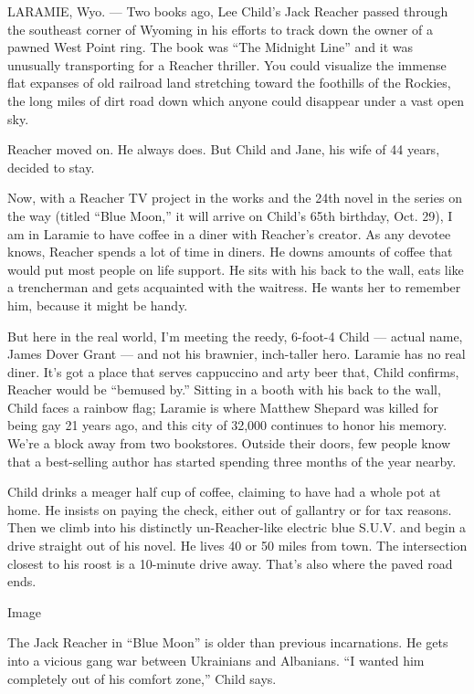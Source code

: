 LARAMIE, Wyo. --- Two books ago, Lee Child's Jack Reacher passed through
the southeast corner of Wyoming in his efforts to track down the owner
of a pawned West Point ring. The book was ``The Midnight Line'' and it
was unusually transporting for a Reacher thriller. You could visualize
the immense flat expanses of old railroad land stretching toward the
foothills of the Rockies, the long miles of dirt road down which anyone
could disappear under a vast open sky.

Reacher moved on. He always does. But Child and Jane, his wife of 44
years, decided to stay.

Now, with a Reacher TV project in the works and the 24th novel in the
series on the way (titled ``Blue Moon,'' it will arrive on Child's 65th
birthday, Oct. 29), I am in Laramie to have coffee in a diner with
Reacher's creator. As any devotee knows, Reacher spends a lot of time in
diners. He downs amounts of coffee that would put most people on life
support. He sits with his back to the wall, eats like a trencherman and
gets acquainted with the waitress. He wants her to remember him, because
it might be handy.

But here in the real world, I'm meeting the reedy, 6-foot-4 Child ---
actual name, James Dover Grant --- and not his brawnier, inch-taller
hero. Laramie has no real diner. It's got a place that serves cappuccino
and arty beer that, Child confirms, Reacher would be ``bemused by.''
Sitting in a booth with his back to the wall, Child faces a rainbow
flag; Laramie is where Matthew Shepard was killed for being gay 21 years
ago, and this city of 32,000 continues to honor his memory. We're a
block away from two bookstores. Outside their doors, few people know
that a best-selling author has started spending three months of the year
nearby.

Child drinks a meager half cup of coffee, claiming to have had a whole
pot at home. He insists on paying the check, either out of gallantry or
for tax reasons. Then we climb into his distinctly un-Reacher-like
electric blue S.U.V. and begin a drive straight out of his novel. He
lives 40 or 50 miles from town. The intersection closest to his roost is
a 10-minute drive away. That's also where the paved road ends.

Image

The Jack Reacher in ``Blue Moon'' is older than previous incarnations.
He gets into a vicious gang war between Ukrainians and Albanians. ``I
wanted him completely out of his comfort zone,'' Child says.

